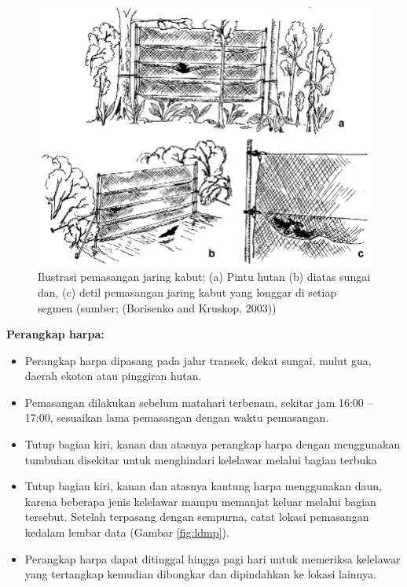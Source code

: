 \documentclass[
  oneside]{book}
\providecommand{\tightlist}{%
  \setlength{\itemsep}{0pt}\setlength{\parskip}{0pt}}
\begin{document}
\begin{figure}

{\centering \includegraphics[width=1\linewidth]{images/mistnetuses} 

}

\caption{Ilustrasi pemasangan jaring kabut; (a) Pintu hutan (b) diatas sungai dan, (c) detil pemasangan jaring kabut yang longgar di setiap segmen (sumber; (Borisenko and Kruskop, 2003))}\label{fig:mistnet}
\end{figure}

\textbf{Perangkap harpa:}

\begin{itemize}
\tightlist
\item
  Perangkap harpa dipasang pada jalur transek, dekat sungai, mulut gua, daerah ekoton atau pinggiran hutan.
\item
  Pemasangan dilakukan sebelum matahari terbenam, sekitar jam 16:00 -- 17:00, sesuaikan lama pemasangan dengan waktu pemasangan.
\item
  Tutup bagian kiri, kanan dan atasnya perangkap harpa dengan menggunakan tumbuhan disekitar untuk menghindari kelelawar melalui bagian terbuka
\item
  Tutup bagian kiri, kanan dan atasnya kantung harpa menggunakan daun, karena beberapa jenis kelelawar mampu memanjat keluar melalui bagian tersebut. Setelah terpasang dengan sempurna, catat lokasi pemasangan kedalam lembar data (Gambar \ref{fig:ldmp}).
\item
  Perangkap harpa dapat ditinggal hingga pagi hari untuk memeriksa kelelawar yang tertangkap kemudian dibongkar dan dipindahkan ke lokasi lainnya.
\end{itemize}
\end{document}
